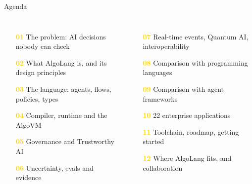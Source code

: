 \documentclass[aspectratio=169,10pt]{beamer}
\begin{document}
\begin{frame}{Agenda}
\begin{columns}[T]
\begin{enumerate}\setlength\itemsep{3pt}
\item[\textcolor{gold}{\bfseries 01}] The problem: AI decisions nobody can check
\item[\textcolor{gold}{\bfseries 02}] What AlgoLang is, and its design principles
\item[\textcolor{gold}{\bfseries 03}] The language: agents, flows, policies, types
\item[\textcolor{gold}{\bfseries 04}] Compiler, runtime and the AlgoVM
\item[\textcolor{gold}{\bfseries 05}] Governance and Trustworthy AI
\item[\textcolor{gold}{\bfseries 06}] Uncertainty, evals and evidence
\end{enumerate}
\begin{enumerate}\setlength\itemsep{3pt}
\item[\textcolor{gold}{\bfseries 07}] Real-time events, Quantum AI, interoperability
\item[\textcolor{gold}{\bfseries 08}] Comparison with programming languages
\item[\textcolor{gold}{\bfseries 09}] Comparison with agent frameworks
\item[\textcolor{gold}{\bfseries 10}] 22 enterprise applications
\item[\textcolor{gold}{\bfseries 11}] Toolchain, roadmap, getting started
\item[\textcolor{gold}{\bfseries 12}] Where AlgoLang fits, and collaboration
\end{enumerate}
\end{columns}
\end{frame}
\end{document}
